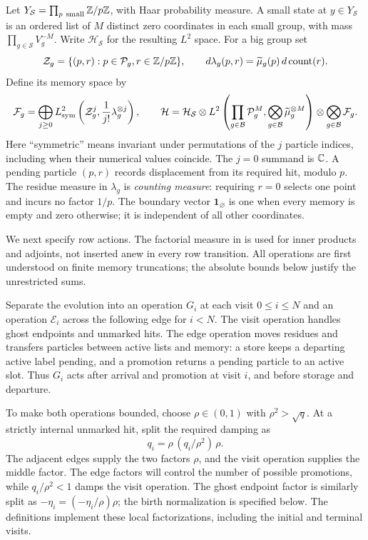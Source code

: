 Let $Y_{\mathcal S}=\prod_{p\ \text{small}}\Z/p\Z$, with Haar
probability measure.  A small state at $y\in Y_{\mathcal S}$ is
an ordered list of $M$ distinct zero coordinates in each small
group, with mass $\prod_{g\in\mathcal S}V_g^{-M}$.  Write
$\mathcal H_{\mathcal S}$ for the resulting $L^2$ space.
For a big group set
\[
 \mathcal Z_g=\{(p,r):p\in\mathcal P_g, r\in\mathbb Z/p\mathbb Z\},
 \qquad d\lambda_g(p,r)=\widetilde\mu_g(p)
                                 \,d\operatorname{count}(r).
\]
Define its memory space by
\begin{equation}\label{eq:memory-hilbert-space}
 \mathcal F_g=\bigoplus_{j\ge0}
 L^2_{\rm sym}\left(\mathcal Z_g^j,\frac1{j!}\lambda_g^{\otimes j}\right),
 \qquad
 \mathcal H=\mathcal H_{\mathcal S}\otimes
 L^2\left(\prod_{g\in\mathcal B}\mathcal P_g^M,
                   \bigotimes_{g\in\mathcal B}\widetilde\mu_g^{\otimes M}\right)
 \otimes\bigotimes_{g\in\mathcal B}\mathcal F_g.
\end{equation}
Here ``symmetric'' means invariant under permutations of the
$j$ particle indices, including when their numerical values
coincide.  The $j=0$ summand is $\mathbb C$.  A pending particle
$(p,r)$ records displacement from its required hit, modulo $p$.
The residue measure in $\lambda_g$ is \emph{counting measure}:
requiring $r=0$ selects one point and incurs no factor $1/p$.
The boundary vector $\mathbf 1_\varnothing$ is one when every
memory is empty and zero otherwise; it is independent of all
other coordinates.

We next specify row actions.  The factorial measure in
 is used for inner products and
adjoints, not inserted anew in every row transition.  All
operations are first understood on finite memory truncations;
the absolute bounds below justify the unrestricted sums.

Separate the evolution into an operation $G_i$ at each visit $0\le i\le N$
and an operation $\mathcal E_i$ across the following edge for $i<N$.
The visit operation handles ghost endpoints and unmarked hits.
The edge operation moves residues and transfers particles between active
lists and memory: a store keeps a departing active label pending, and a
promotion returns a pending particle to an active slot.  Thus $G_i$ acts
after arrival and promotion at visit $i$, and before storage and departure.

To make both operations bounded, choose $\rho\in(0,1)$ with
$\rho^2>\sqrt q$.  At a strictly internal unmarked hit, split the
required damping as
\[
 q_i=\rho\,(q_i/\rho^2)\,\rho.
\]
The adjacent edges supply the two factors $\rho$, and the visit operation
supplies the middle factor.  The edge factors will control the number
of possible promotions, while $q_i/\rho^2<1$ damps the visit operation.
The ghost endpoint factor is similarly split as
$-\eta_i=(-\eta_i/\rho)\rho$; the birth normalization is specified below.
The definitions implement these local factorizations, including the
initial and terminal visits.

